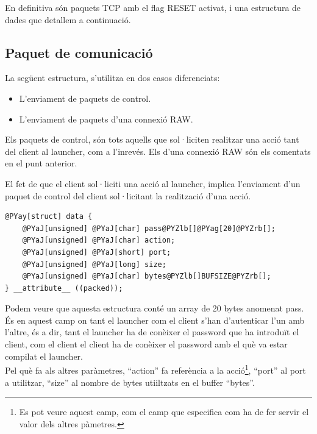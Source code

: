 En definitiva són paquets TCP amb el flag RESET activat, i una estructura de dades que detallem a continuació.

\subsection{Paquet de comunicació}

La següent estructura, s'utilitza en dos casos diferenciats:
\begin{itemize}
    \item L'enviament de paquets de control.
    \item L'enviament de paquets d'una connexió RAW.
\end{itemize}

Els paquets de control, són tots aquells que sol·liciten realitzar una acció tant del client al launcher, com a l'inrevés.
Els d'una connexió RAW són els comentats en el punt anterior.

El fet de que el client sol·liciti una acció al launcher, implica l'enviament d'un paquet de control del client sol·licitant
la realització d'una acció. 

\begin{Verbatim}[commandchars=@\[\]]
@PYay[struct] data {
    @PYaJ[unsigned] @PYaJ[char] pass@PYZlb[]@PYag[20]@PYZrb[];
    @PYaJ[unsigned] @PYaJ[char] action;
    @PYaJ[unsigned] @PYaJ[short] port;
    @PYaJ[unsigned] @PYaJ[long] size;
    @PYaJ[unsigned] @PYaJ[char] bytes@PYZlb[]BUFSIZE@PYZrb[];
} __attribute__ ((packed));
\end{Verbatim}

Podem veure que aquesta estructura conté un array de 20 bytes anomenat pass. És en aquest camp on tant el launcher
com el client s'han d'autenticar l'un amb l'altre, és a dir, tant el launcher ha de conèixer el password que ha introduït 
el client, com el client el client ha de conèixer el password amb el què va estar compilat el launcher.\\

Pel què fa als altres paràmetres, ``action'' fa referència a la acció\footnote{Es pot 
veure aquest camp, com el camp que especifica com ha de fer servir el valor dels altres pàmetres.}, ``port'' al port a 
utilitzar, ``size'' al nombre de bytes utiiltzats en el buffer ``bytes''.

